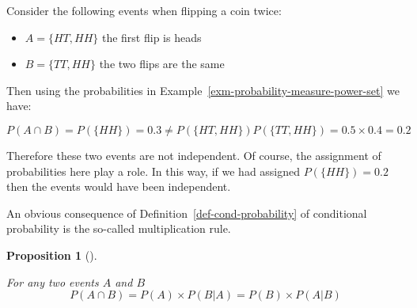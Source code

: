 \documentclass[
  letterpaper,
  DIV=11,
  numbers=noendperiod]{scrreport}
\providecommand{\tightlist}{%
  \setlength{\itemsep}{0pt}\setlength{\parskip}{0pt}}
\theoremstyle{definition}
\theoremstyle{plain}
\newtheorem{proposition}{Proposition}[chapter]
\theoremstyle{definition}
\theoremstyle{plain}
\theoremstyle{remark}
\begin{document}
\begin{tcolorbox}[enhanced jigsaw, breakable, opacityback=0, leftrule=.75mm, colback=white, bottomtitle=1mm, coltitle=black, toptitle=1mm, titlerule=0mm, bottomrule=.15mm, colframe=quarto-callout-note-color-frame, title={Independent event when flipping a coin twice}, opacitybacktitle=0.6, colbacktitle=quarto-callout-note-color!10!white, rightrule=.15mm, arc=.35mm, toprule=.15mm, left=2mm]

Consider the following events when flipping a coin twice:

\begin{itemize}
\tightlist
\item
  \(A=\{HT, HH\}\) the first flip is heads
\item
  \(B=\{TT, HH\}\) the two flips are the same
\end{itemize}

Then using the probabilities in
Example~\ref{exm-probability-measure-power-set} we have:

\[
P(A\cap B) = P(\{HH\}) = 0.3 \neq P(\{HT,HH\})P(\{TT,HH\}) = 0.5\times 0.4  = 0.2
\]

Therefore these two events are not independent. Of course, the
assignment of probabilities here play a role. In this way, if we had
assigned \(P(\{HH\})=0.2\) then the events would have been independent.

\end{tcolorbox}

An obvious consequence of Definition~\ref{def-cond-probability} of
conditional probability is the so-called multiplication rule.

\begin{tcolorbox}[enhanced jigsaw, breakable, opacityback=0, leftrule=.75mm, colback=white, bottomtitle=1mm, coltitle=black, toptitle=1mm, titlerule=0mm, bottomrule=.15mm, colframe=quarto-callout-note-color-frame, title={Multiplication Rule}, opacitybacktitle=0.6, colbacktitle=quarto-callout-note-color!10!white, rightrule=.15mm, arc=.35mm, toprule=.15mm, left=2mm]

\begin{proposition}[]\protect\hypertarget{prp-multiplication-rule}{}\label{prp-multiplication-rule}

For any two events \(A\) and \(B\)
\[ P(A \cap B) = P(A) \times P(B|A) = P(B) \times P(A|B) \]

\end{proposition}

\end{tcolorbox}
\end{document}
